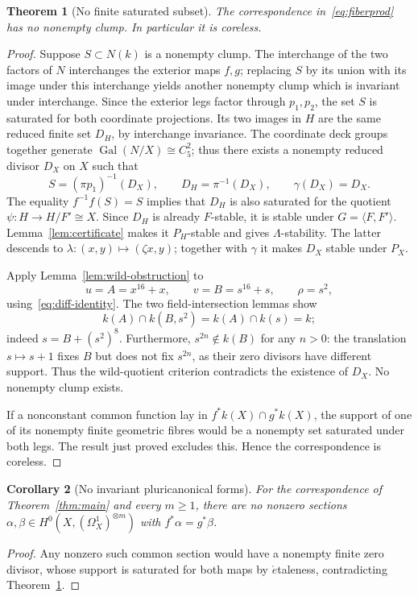 \documentclass[11pt,a4paper,reqno]{amsart}
\newtheorem{theorem}{Theorem}[section]
\newtheorem{corollary}[theorem]{Corollary}
\newcommand{\Gal}{\operatorname{Gal}}
\begin{document}
\begin{theorem}[No finite saturated subset]\label{thm:noclump}
The correspondence in~\eqref{eq:fiberprod} has no nonempty clump.
In particular it is coreless.
\end{theorem}
\begin{proof}
Suppose $S\subset N(k)$ is a nonempty clump. The interchange of the
two factors of $N$ interchanges the exterior maps $f,g$; replacing $S$
by its union with its image under this interchange yields another
nonempty clump which is invariant under interchange.
Since the exterior legs factor through $p_1,p_2$, the set $S$ is
saturated for both coordinate projections. Its two images in $H$
are the same reduced finite set $D_H$, by interchange invariance.
The coordinate deck groups together generate
$\Gal(N/X)\cong C_5^2$; thus there exists a nonempty reduced divisor
$D_X$ on $X$ such that
\[
  S=(\pi p_1)^{-1}(D_X),\qquad
  D_H=\pi^{-1}(D_X),\qquad \gamma(D_X)=D_X.
\]
The equality $f^{-1}f(S)=S$ implies that $D_H$ is also saturated
for the quotient $\psi:H\to H/F'\cong X$. Since $D_H$ is already
$F$-stable, it is stable under $G=\langle F,F'\rangle$.
Lemma~\ref{lem:certificate} makes it $P_H$-stable and gives
$\Lambda$-stability. The latter descends to
$\lambda:(x,y)\mapsto(\zeta x,y)$; together with $\gamma$ it
makes $D_X$ stable under $P_X$.

Apply Lemma~\ref{lem:wild-obstruction} to
\[
 u=A=x^{16}+x,\qquad v=B=s^{16}+s,\qquad \rho=s^2,
\]
using~\eqref{eq:diff-identity}. The two field-intersection
lemmas show
\[
 k(A)\cap k(B,s^2)=k(A)\cap k(s)=k;
\]
indeed $s=B+(s^2)^8$. Furthermore, $s^{2n}\notin k(B)$ for
any $n>0$: the translation $s\mapsto s+1$ fixes $B$ but does
not fix $s^{2n}$, as their zero divisors have different support.
Thus the wild-quotient criterion contradicts the existence of
$D_X$. No nonempty clump exists.

If a nonconstant common function lay in
$f^*k(X)\cap g^*k(X)$, the support of one of its nonempty finite
geometric fibres would be a nonempty set saturated under both legs.
The result just proved excludes this. Hence the correspondence is
coreless.
\end{proof}

\begin{corollary}[No invariant pluricanonical forms]
\label{cor:pluri}
For the correspondence of Theorem~\ref{thm:main} and every
$m\ge1$, there are no nonzero sections
$\alpha,\beta\in H^0(X,(\Omega_X^1)^{\otimes m})$ with
$f^*\alpha=g^*\beta$.
\end{corollary}
\begin{proof}
Any nonzero such common section would have a nonempty finite
zero divisor, whose support is saturated for both maps by
\(\acute{e}\)taleness, contradicting
Theorem~\ref{thm:noclump}.
\end{proof}
\end{document}
